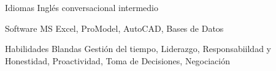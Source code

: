 

\begin{cvskills}

  \cvskill
    {Idiomas} %
	{Inglés conversacional intermedio} %

  \cvskill
    {Software} %
    {MS Excel, ProModel, AutoCAD, Bases de Datos} %

  \cvskill
    {Habilidades Blandas} %
	{Gestión del tiempo, Liderazgo, Responsabiildad y Honestidad, Proactividad, Toma de Decisiones, Negociación} %

\end{cvskills}
